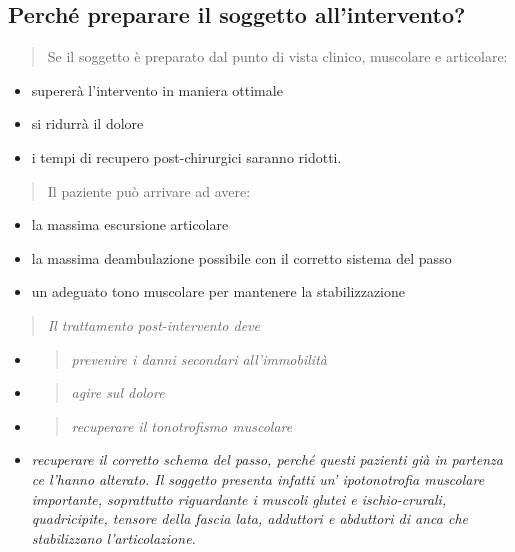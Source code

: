 \documentclass[]{article}
\begin{document}
\subsection{Perché preparare il soggetto
all'intervento?}\label{perchuxe9-preparare-il-soggetto-allintervento}

\begin{quote}
Se il soggetto è preparato dal punto di vista clinico, muscolare e
articolare:
\end{quote}

\begin{itemize}
\item
  supererà l'intervento in maniera ottimale
\item
  si ridurrà il dolore
\item
  i tempi di recupero post-chirurgici saranno ridotti.
\end{itemize}

\begin{quote}
Il paziente può arrivare ad avere:
\end{quote}

\begin{itemize}
\item
  la massima escursione articolare
\item
  la massima deambulazione possibile con il corretto sistema del passo
\item
  un adeguato tono muscolare per mantenere la stabilizzazione
\end{itemize}

\begin{quote}
\emph{Il trattamento post-intervento deve}
\end{quote}

\begin{itemize}
\item
  \begin{quote}
  \emph{prevenire i danni secondari all'immobilità}
  \end{quote}
\item
  \begin{quote}
  \emph{agire sul dolore}
  \end{quote}
\item
  \begin{quote}
  \emph{recuperare il tonotrofismo muscolare}
  \end{quote}
\item
  \emph{recuperare il corretto schema del passo, perché questi pazienti
  già in partenza ce l'hanno alterato. Il soggetto presenta infatti un'
  ipotonotrofia muscolare importante, soprattutto riguardante i muscoli
  glutei e ischio-crurali, quadricipite, tensore della fascia lata,
  adduttori e abduttori di anca che stabilizzano l'articolazione.}
\end{itemize}
\end{document}

